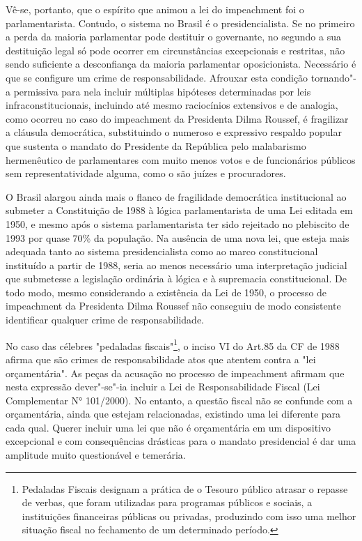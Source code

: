 Vê-se, portanto, que o espírito que animou a lei do impeachment foi o
parlamentarista. Contudo, o sistema no Brasil é o presidencialista. Se
no primeiro a perda da maioria parlamentar pode destituir o governante,
no segundo a sua destituição legal só pode ocorrer em circunstâncias
excepcionais e restritas, não sendo suficiente a desconfiança da maioria
parlamentar oposicionista. Necessário é que se configure um crime de
responsabilidade. Afrouxar esta condição tornando"-a permissiva para nela
incluir múltiplas hipóteses determinadas por leis infraconstitucionais,
incluindo até mesmo raciocínios extensivos e de analogia, como ocorreu
no caso do impeachment da Presidenta Dilma Roussef, é fragilizar a
cláusula democrática, substituindo o numeroso e expressivo respaldo
popular que sustenta o mandato do Presidente da República pelo
malabarismo hermenêutico de parlamentares com muito menos votos e de
funcionários públicos sem representatividade alguma, como o são juízes e
procuradores.

O Brasil alargou ainda mais o flanco de fragilidade democrática
institucional ao submeter a Constituição de 1988 à lógica
parlamentarista de uma Lei editada em 1950, e mesmo após o sistema
parlamentarista ter sido rejeitado no plebiscito de 1993 por quase 70\%
da população. Na ausência de uma nova lei, que esteja mais adequada
tanto ao sistema presidencialista como ao marco constitucional
instituído a partir de 1988, seria ao menos necessário uma interpretação
judicial que submetesse a legislação ordinária à lógica e à supremacia
constitucional. De todo modo, mesmo considerando a existência da Lei de
1950, o processo de impeachment da Presidenta Dilma Roussef não
conseguiu de modo consistente identificar qualquer crime de
responsabilidade.

No caso das célebres "pedaladas fiscais"\footnote{Pedaladas Fiscais
  designam a prática de o Tesouro público atrasar o repasse de verbas,
  que foram utilizadas para programas públicos e sociais, a instituições
  financeiras públicas ou privadas, produzindo com isso uma melhor
  situação fiscal no fechamento de um determinado período.}, o inciso VI
do Art.85 da CF de 1988 afirma que são crimes de responsabilidade atos
que atentem contra a "lei orçamentária". As peças da acusação no
processo de impeachment afirmam que nesta expressão dever"-se"-ia incluir
a Lei de Responsabilidade Fiscal (Lei Complementar N° 101/2000). No
entanto, a questão fiscal não se confunde com a orçamentária, ainda que
estejam relacionadas, existindo uma lei diferente para cada qual. Querer
incluir uma lei que não é orçamentária em um dispositivo excepcional e
com consequências drásticas para o mandato presidencial é dar uma
amplitude muito questionável e temerária.

